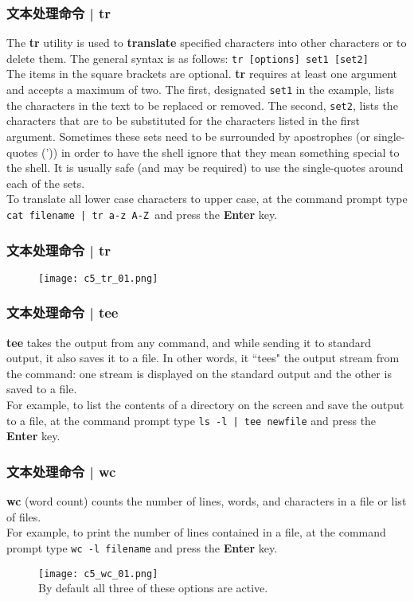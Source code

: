 \begin{frame}[fragile]
  \frametitle{文本处理命令 | tr}
  The \textbf{tr} utility is used to \textbf{translate} specified characters into other characters or to delete them. The general syntax is as follows: \verb|tr [options] set1 [set2]|\\
  \vspace{0.3cm}
  The items in the square brackets are optional. \textbf{tr} requires at least one argument and accepts a maximum of two. The first, designated \verb|set1| in the example, lists the characters in the text to be replaced or removed. The second, \verb|set2|, lists the characters that are to be substituted for the characters listed in the first argument. Sometimes these sets need to be surrounded by apostrophes (or single-quotes (')) in order to have the shell ignore that they mean something special to the shell. It is usually safe (and may be required) to use the single-quotes around each of the sets.\\
  \vspace{0.3cm}
  To translate all lower case characters to upper case, at the command prompt type \verb=cat filename | tr a-z A-Z =and press the \textbf{Enter} key.
\end{frame}

\begin{frame}
  \frametitle{文本处理命令 | tr}
  \begin{figure}
    \centering
    \texttt{[image: c5\_tr\_01.png]}
  \end{figure}
\end{frame}

\begin{frame}[fragile]
  \frametitle{文本处理命令 | tee}
  \textbf{tee} takes the output from any command, and while sending it to standard output, it also saves it to a file. In other words, it ``tees" the output stream from the command: one stream is displayed on the standard output and the other is saved to a file.\\
  \vspace{0.3cm}
  For example, to list the contents of a directory on the screen and save the output to a file, at the command prompt type \verb=ls -l | tee newfile= and press the \textbf{Enter} key.
\end{frame}

\begin{frame}[fragile]
  \frametitle{文本处理命令 | wc}
  \textbf{wc} (word count) counts the number of lines, words, and characters in a file or list of files.\\
  \vspace{0.3cm}
  For example, to print the number of lines contained in a file, at the command prompt type \verb|wc -l filename| and press the \textbf{Enter} key.
  \begin{figure}
    \centering
    \texttt{[image: c5\_wc\_01.png]}\\
  By default all three of these options are active.
  \end{figure}
\end{frame}

